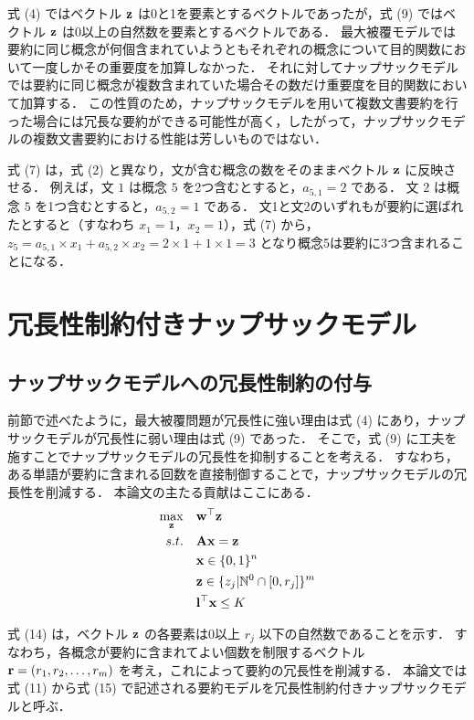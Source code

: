 \documentclass[japanese]{jnlp_1.4}
\begin{document}
式 (4) ではベクトル $ {\bf z } $ は0と1を要素とするベクトルであったが，式 (9) ではベクトル $ {\bf z } $ は0以上の自然数を要素とするベクトルである．
\pagebreak
最大被覆モデルでは要約に同じ概念が何個含まれていようともそれぞれの概念について目的関数において一度しかその重要度を加算しなかった．
それに対してナップサックモデルでは要約に同じ概念が複数含まれていた場合その数だけ重要度を目的関数において加算する．
この性質のため，ナップサックモデルを用いて複数文書要約を行った場合には冗長な要約ができる可能性が高く，したがって，ナップサックモデルの複数文書要約における性能は芳しいものではない．

式 (7) は，式 (2) と異なり，文が含む概念の数をそのままベクトル $ {\bf z} $ に反映させる．
例えば，文 $ 1 $ は概念 $ 5 $ を2つ含むとすると，$ a_{5,1} = 2 $ である．
文 $ 2 $ は概念 $ 5 $ を1つ含むとすると，$ a_{5,2} = 1 $ である．
文1と文2のいずれもが要約に選ばれたとすると（すなわち $ x_{1} = 1 $，$ x_{2} = 1 $），式 (7) から，$ z_{5} = a_{5,1} \times x_{1} + a_{5,2} \times x_{2} = 2 \times 1 + 1 \times 1 = 3 $ となり概念5は要約に3つ含まれることになる．



\section{冗長性制約付きナップサックモデル}

\subsection{ナップサックモデルへの冗長性制約の付与}

前節で述べたように，最大被覆問題が冗長性に強い理由は式 (4) にあり，ナップサックモデルが冗長性に弱い理由は式 (9) であった．
そこで，式 (9) に工夫を施すことでナップサックモデルの冗長性を抑制することを考える．
すなわち，ある単語が要約に含まれる回数を直接制御することで，ナップサックモデルの冗長性を削減する．
本論文の主たる貢献はここにある．
\begin{align}
\max_{{\bf z}} & \quad {\bf w}^{\top} {\bf z} \\
s.t. & \quad {\bf Ax} = {\bf z} \\
& \quad {\bf x} \in \{0, 1\}^{n} \\
& \quad {\bf z} \in \{ z_{j} | \mathbb{N}^{0} \cap [0, r_{j}] \}^{m} \\
& \quad {\bf l}^{\top} {\bf x} \leq K
\end{align}

式 (14) は，ベクトル $ {\bf z} $ の各要素は0以上 $ r_{j} $ 以下の自然数であることを示す．
すなわち，各概念が要約に含まれてよい個数を制限するベクトル $ {\bf r} = (r_{1}, r_{2}, \ldots, r_{m}) $ を考え，これによって要約の冗長性を削減する．
本論文では式 (11) から式 (15) で記述される要約モデルを冗長性制約付きナップサックモデルと呼ぶ．
\end{document}
